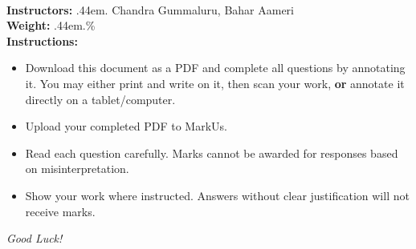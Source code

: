\documentclass[12pt]{article}
\makeatletter
\newcommand\cdotfill{%
    \leavevmode\cleaders\hb@xt@.44em{\hss$.$\hss}\hfill\kern\z@
}
\makeatother
\begin{document}
\begin{minipage}{0.6\textwidth}
\begin{tabular}{|c|c|c|c|c|c|c|c|c|c|}
  \hspace{1.2em}\; & \hspace{1.2em}\; & \hspace{1.2em}\; & \hspace{1.2em}\; & \hspace{1.2em}\; & \hspace{1.2em}\; & \hspace{1.2em}\; & \hspace{1.2em}\; & \hspace{1.2em}\; & \hspace{1.2em}\;\\
  \hline
\end{tabular}
\end{minipage}
\\[0.75cm]
\noindent \textbf{Instructors:}\cdotfill Chandra Gummaluru, Bahar Aameri\\
\textbf{Weight:}\cdotfill 5\% \\
\textbf{Instructions:}
\begin{itemize}
    \item Download this document as a PDF and complete all questions by annotating it. You may either print and write on it, then scan your work, \textbf{or} annotate it directly on a tablet/computer.
    \item Upload your completed PDF to MarkUs.
    \item Read each question carefully. Marks cannot be awarded for responses based on misinterpretation.
    \item Show your work where instructed. Answers without clear justification will not receive marks.
\end{itemize}
\vspace{0.25cm}
\begin{center}
    \textit{Good Luck!}
\end{center}

\clearpage


\end{document}
